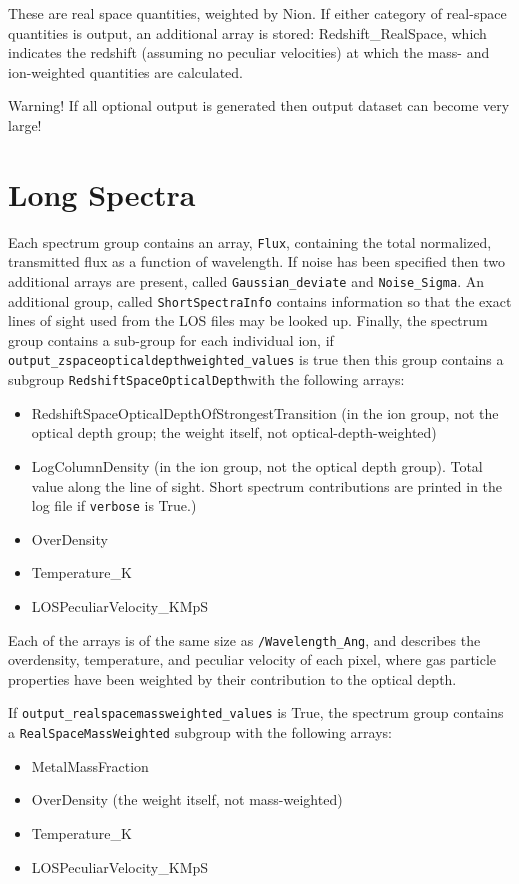 \documentclass{report}
\newcommand{\param}[1]{{\tt #1}}
\begin{document}
These are real space quantities, weighted by Nion.  If either category of real-space quantities is output, an additional array is stored: Redshift\_RealSpace, which indicates the redshift (assuming no peculiar velocities) at which the mass- and ion-weighted quantities are calculated.

Warning!  If all optional output is generated then output dataset can become very large!

\section{Long Spectra}

Each spectrum group contains an array, {\tt Flux}, containing the total normalized, transmitted flux as a function of wavelength.  If noise has been specified then two additional arrays are present, called {\tt Gaussian\_deviate} and {\tt Noise\_Sigma}.  An additional group, called {\tt ShortSpectraInfo} contains information so that the exact lines of sight used from the LOS files may be looked up.  Finally, the spectrum group contains a sub-group for each individual ion, if {\tt output\_zspaceopticaldepthweighted\_values} is true then this group contains a subgroup {\tt RedshiftSpaceOpticalDepth}with the following arrays:

\begin{itemize}
\item RedshiftSpaceOpticalDepthOfStrongestTransition (in the ion group, not the optical depth group; the weight itself, not optical-depth-weighted)
\item LogColumnDensity (in the ion group, not the optical depth group). Total value along the line of sight. Short spectrum contributions are printed in the log file if \param{verbose} is True.)
\item OverDensity
\item Temperature\_K
\item LOSPeculiarVelocity\_KMpS
\end{itemize}

Each of the arrays is of the same size as {\tt /Wavelength\_Ang}, and describes the overdensity, temperature, and peculiar velocity of each pixel, where gas particle properties have been weighted by their contribution to the optical depth.

If \param{output\_realspacemassweighted\_values} is True, the spectrum group contains a \param{RealSpaceMassWeighted} subgroup with the following arrays:
\begin{itemize}
\item MetalMassFraction 
\item OverDensity (the weight itself, not mass-weighted)
\item Temperature\_K
\item LOSPeculiarVelocity\_KMpS
\end{itemize}
\end{document}
